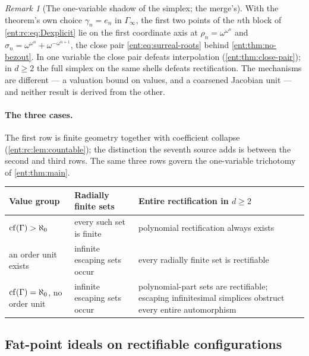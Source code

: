 \documentclass[11pt]{article}
\theoremstyle{plain}
\theoremstyle{plain}
\theoremstyle{plain}
\theoremstyle{definition}
\theoremstyle{definition}
\theoremstyle{definition}
\theoremstyle{definition}
\theoremstyle{remark}
\newtheorem{remark}[remark]{Remark}
\begin{document}
\begin{remark}[The one-variable shadow of the simplex; the merge's]
\label{ent:rc:rem:close-pair}
With the theorem's own choice $\gamma_n=e_n$ in $\Gamma_\infty$, the first two
points of the $n$th block of \eqref{ent:rc:eq:Dexplicit} lie on the first
coordinate axis at $\rho_n=\omega^{\omega^n}$ and
$\sigma_n=\omega^{\omega^n}+\omega^{-\omega^{n+1}}$, the close pair
\eqref{ent:eq:surreal-roots} behind \cref{ent:thm:no-bezout}. In one variable
the close pair defeats interpolation (\cref{ent:thm:close-pair}); in $d\ge2$
the full simplex on the same shells defeats rectification. The mechanisms are
different --- a valuation bound on values, and a coarsened Jacobian unit ---
and neither result is derived from the other.
\end{remark}

\paragraph{The three cases.} The first row is finite geometry together with
coefficient collapse (\cref{ent:rc:lem:countable}); the distinction the seventh
source adds is between the second and third rows. The same three rows govern
the one-variable trichotomy of \cref{ent:thm:main}.

\begin{center}
\small
\begin{tabular}{@{}>{\raggedright\arraybackslash}p{}>{\raggedright\arraybackslash}p{}>{\raggedright\arraybackslash}p{}@{}}
\toprule
Value group & Radially finite sets & Entire rectification in $d\ge2$\\
\midrule
$\operatorname{cf}(\Gamma)>\aleph_0$ & every such set is finite & polynomial
rectification always exists\\[3pt]
an order unit exists & infinite escaping sets occur & every radially finite
set is rectifiable\\[3pt]
$\operatorname{cf}(\Gamma)=\aleph_0$, no order unit & infinite escaping sets occur &
polynomial-part sets are rectifiable; escaping infinitesimal simplices
obstruct every entire automorphism\\
\bottomrule
\end{tabular}
\end{center}

\subsection{Fat-point ideals on rectifiable configurations}
\label{ent:rc:subsec:ideals}
\end{document}

